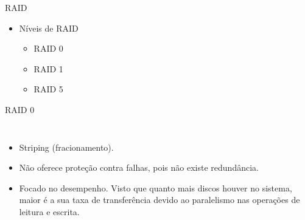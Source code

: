 \begin{frame}{RAID}
	\begin{itemize}
		\item Níveis de RAID
		\begin{itemize}
			\item RAID 0
			\item RAID 1
			\item RAID 5
		\end{itemize}
	\end{itemize}
\end{frame}

\begin{frame}{RAID 0}
	\begin{columns}
		\begin{itemize}
			\item Striping (fracionamento).
			\item Não oferece proteção contra falhas, pois não existe redundância.
			\item Focado no desempenho. Visto que quanto mais discos houver no sistema, maior é a sua taxa de transferência devido ao paralelismo nas operações de leitura e escrita.
		\end{itemize}
		

\end{columns}
\end{frame}
